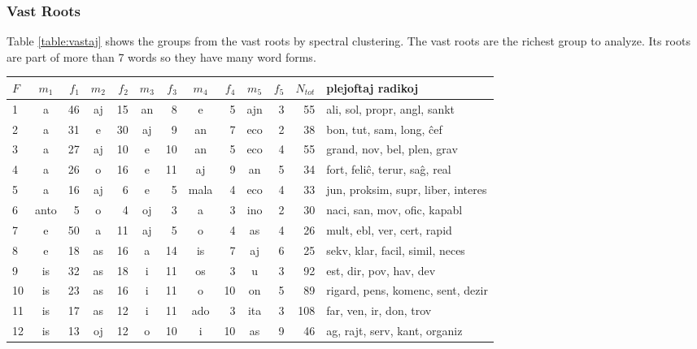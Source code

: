 \documentclass[12pt,twoside]{article}
\begin{document}
\subsubsection{Vast Roots}
Table \ref{table:vastaj} shows the groups from the vast roots by spectral clustering. 
The vast roots are the richest group to analyze. Its roots are part of more than 7 words so they have many word forms.

\vspace{.2 in}
\begin{table}[h!]
\begin{center}
\begin{tabular}{ |l||c|r||c|r||c|r||c|r||c|r||r|l| }
\hline
$F$& $m_1$ & $f_1$&$m_2$ & $f_2$&$m_3$ & $f_3$& $m_4$  & $f_4$& $m_5$ & $f_5$& $N_{tot}$ &   plejoftaj radikoj     \\
\hline
1     &a   &46  &aj   &15   &an    &8     &e    &5   &ajn    &3   &55 &          ali, sol, propr, angl, sankt \\
2     &a   &31   &e   &30   &aj    &9    &an    &7   &eco    &2   &38 &              bon, tut, sam, long, ĉef \\
3     &a   &27  &aj   &10    &e   &10    &an    &5   &eco    &4   &55 &           grand, nov, bel, plen, grav \\
4     &a   &26   &o   &16    &e   &11    &aj    &9    &an    &5   &34 &         fort, feliĉ, terur, saĝ, real \\
5     &a   &16  &aj    &6    &e    &5  &mala    &4   &eco    &4   &33 &    jun, proksim, supr, liber, interes \\
6  &anto    &5   &o    &4   &oj    &3     &a    &3   &ino    &2   &30 &          naci, san, mov, ofic, kapabl \\
7     &e   &50   &a   &11   &aj    &5     &o    &4    &as    &4   &26 &           mult, ebl, ver, cert, rapid \\
8     &e   &18  &as   &16    &a   &14    &is    &7    &aj    &6   &25 &       sekv, klar, facil, simil, neces \\
9    &is   &32  &as   &18    &i   &11    &os    &3     &u    &3   &92 &               est, dir, pov, hav, dev \\
10    &is   &23  &as   &16    &i   &11     &o   &10    &on    &5   &89 &     rigard, pens, komenc, sent, dezir \\
11    &is   &17  &as   &12    &i   &11   &ado    &3   &ita    &3  &108 &               far, ven, ir, don, trov \\
12    &is   &13  &oj   &12    &o   &10     &i   &10    &as    &9   &46 &         ag, rajt, serv, kant, organiz \\

\end{tabular}
\end{center}
\end{table}
\end{document}
